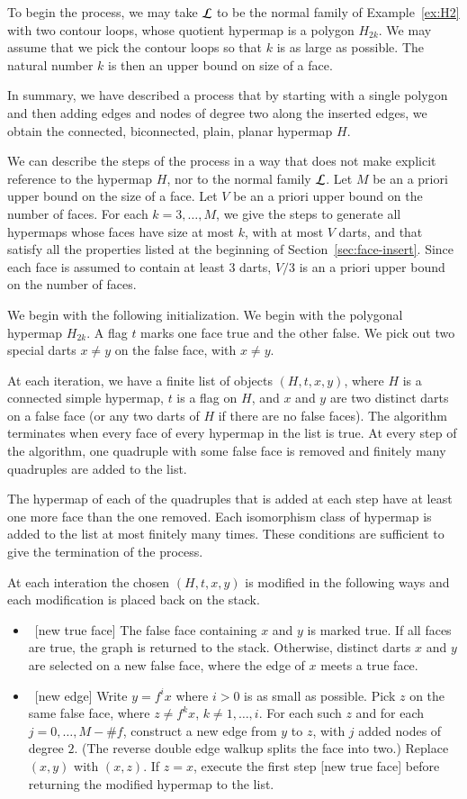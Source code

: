 To begin the process, we may take ${\cal L}$ to be the normal family of Example~\ref{ex:H2} with two contour loops, whose quotient hypermap is a polygon $H_{2k}$.  We may assume that we pick the contour loops so that $k$ is as large as possible.  The natural number $k$ is then an upper bound on size of a face.

In summary, we have described a process that by starting with a single polygon and then adding edges and nodes of degree two along the inserted edges, we obtain the connected, biconnected, plain, planar hypermap $H$.

We can describe the steps of the process in a way that does not make explicit reference to the hypermap $H$, nor to the normal family ${\cal L}$.  Let $M$ be an a priori upper bound on the size of a face.  Let $V$ be an a priori upper bound on the number of faces.  For each $k=3,\ldots,M$, we give the steps to generate all  hypermaps whose faces have size at most $k$, with at most $V$ darts, and that satisfy all the properties listed at the beginning of Section~\ref{sec:face-insert}.  Since each face is assumed to contain at least $3$ darts, $V/3$ is an a priori upper bound on the number of faces.

We begin with the following initialization.
We begin with the polygonal hypermap $H_{2k}$.  A flag $t$ marks one face  true and the other false.  We pick out two special darts $x\ne y$ on the false face, with $x\ne y$. 

At each iteration, we have a finite list of objects $(H,t,x,y)$, where $H$ is a connected simple hypermap, $t$ is a flag on $H$, and $x$ and $y$ are two distinct darts on a false face (or any two darts of $H$ if there are no false faces).  The algorithm terminates when every face of every hypermap in the list is true.  At every step of the algorithm, one quadruple with some false face is removed and finitely many quadruples are added to the list.


The hypermap of each of the quadruples that is added at each step have at least one more face than the one removed.  Each isomorphism class of hypermap is added to the list at most finitely many times.  These conditions are sufficient to give the termination of the process.

At each interation the chosen $(H,t,x,y)$ is modified in the following ways and each modification is placed back on the stack.
\begin{itemize}
\item ~[new true face] The false face containing $x$ and $y$ is marked true.  If all faces are true, the graph is returned to the stack.  Otherwise, distinct darts $x$ and $y$ are selected on a new false face, where the edge of $x$ meets a true face.
\item ~[new edge] Write $y=f^i x$ where $i>0$ is as small as possible.  Pick $z$ on the same false face, where $z\ne f^k x$, $k\ne 1,\ldots,i$.  For each such $z$ and for each $j=0,\ldots,M-\#f$, construct a new edge from $y$ to $z$, with $j$ added nodes of degree $2$.  (The reverse double edge walkup splits the face into two.)  Replace $(x,y)$ with $(x,z)$.  If $z=x$, execute the first step [new true face] before returning the modified hypermap to the list.
\end{itemize}

